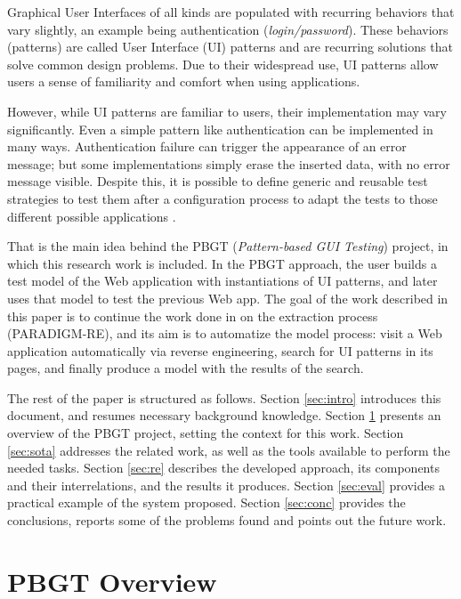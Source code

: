 \documentclass[conference]{IEEEtran}
\begin{document}
Graphical User Interfaces of all kinds are populated with recurring behaviors that vary slightly, an example being authentication (\textit{login/password}). These behaviors (patterns) are called User Interface (UI) patterns \cite{van2001patterns} and are recurring solutions that solve common design problems. Due to their widespread use, UI patterns allow users a sense of familiarity and comfort when using applications. 

However, while UI patterns are familiar to users, their implementation may vary significantly. Even a simple pattern like authentication can be implemented in many ways. Authentication failure can trigger the appearance of an error message; but some implementations simply erase the inserted data, with no error message visible. Despite this, it is possible to define generic and reusable test strategies to test them after a configuration process to adapt the tests to those different possible applications \cite{morgado2012gui}. 

That is the main idea behind the PBGT (\textit{Pattern-based GUI Testing}) project, in which this research work is included. In the PBGT approach, the user builds a test model of the Web application with instantiations of UI patterns, and later uses that model to test the previous Web app.  The goal of the work described in this paper is to continue the work done in \cite{nabuco2013inferring} on the extraction process (PARADIGM-RE), and  its aim is to automatize the model process: visit a Web application automatically  via reverse engineering, search for UI patterns in its pages, and finally produce a model with the results of the search.

The rest of the paper is structured as follows. Section \ref{sec:intro} introduces this document, and resumes necessary background knowledge. Section \ref{sec:pbgt} presents an overview of the PBGT project, setting the context for this work. Section \ref{sec:sota} addresses the related work, as well as the tools available to perform the needed tasks. Section \ref{sec:re} describes the developed approach, its components and  their interrelations, and the results it produces. Section \ref{sec:eval} provides a practical example of the system proposed. Section \ref{sec:conc} provides the conclusions, reports some of the problems found and points out the future work. 

\section{PBGT Overview}\label{sec:pbgt}
\end{document}
